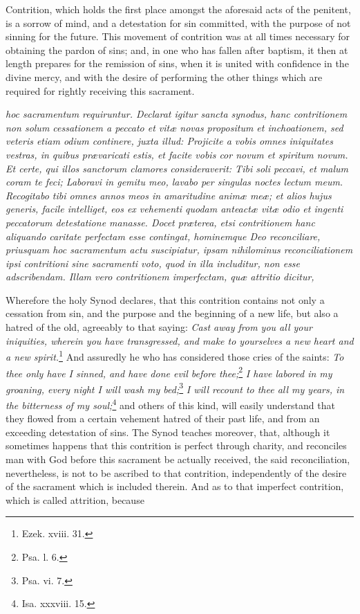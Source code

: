 Contrition, which holds the first place amongst the aforesaid acts of the penitent, is a sorrow of mind, and a detestation for sin committed, with the purpose of not sinning for the future. This movement of contrition was at all times necessary for obtaining the pardon of sins; and, in one who has fallen after baptism, it then at length prepares for the remission of sins, when it is united with confidence in the divine mercy, and with the desire of performing the other things which are required for rightly receiving this sacrament.

\emph{hoc sacramentum requiruntur. Declarat igitur sancta synodus, hanc contritionem non solum cessationem a peccato et vitæ novas propositum et inchoationem, sed veteris etiam odium continere, juxta illud: Projicite a vobis omnes iniquitates vestras, in quibus prævaricati estis, et facite vobis cor novum et spiritum novum. Et certe, qui illos sanctorum clamores consideraverit: Tibi soli peccavi, et malum coram te feci; Laboravi in gemitu meo, lavabo per singulas noctes lectum meum. Recogitabo tibi omnes annos meos in amaritudine animæ meæ; et alios hujus generis, facile intelliget, eos ex vehementi quodam anteactæ vitæ odio et ingenti peccatorum detestatione manasse. Docet præterea, etsi contritionem hanc aliquando caritate perfectam esse contingat, hominemque Deo reconciliare, priusquam hoc sacramentum actu suscipiatur, ipsam nihilominus reconciliationem ipsi contritioni sine sacramenti voto, quod in illa includitur, non esse adscribendam. Illam vero contritionem imperfectam, quæ attritio dicitur, }

Wherefore the holy Synod declares, that this contrition contains not only a cessation from sin, and the purpose and the beginning of a new life, but also a hatred of the old, agreeably to that saying: \emph{Cast away from you all your iniquities, wherein you have transgressed, and make to yourselves a new heart and a new spirit.}\footnote{\par   Ezek. xviii. 31.} And assuredly he who has considered those cries of the saints: \emph{To thee only have I sinned, and have done evil before thee;}\footnote{\par   Psa. l. 6.} \emph{I have labored in my groaning, every night I will wash my bed;}\footnote{\par  Psa. vi. 7.} \emph{I will recount to thee all my years, in the bitterness of my soul;}\footnote{\par   Isa. xxxviii. 15.} and others of this kind, will easily understand that they flowed from a certain vehement hatred of their past life, and from an exceeding detestation of sins. The Synod teaches moreover, that, although it sometimes happens that this contrition is perfect through charity, and reconciles man with God before this sacrament be actually received, the said reconciliation, nevertheless, is not to be ascribed to that contrition, independently of the desire of the sacrament which is included therein. And as to that imperfect contrition, which is called attrition, because

